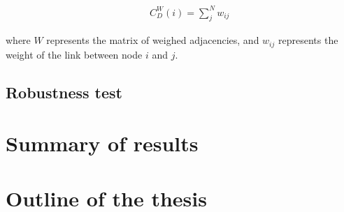 \begin{eqnarray}
&&C_D^W(i)=\sum_{j}^{N}w_{ij}
\end{eqnarray}

where $W$ represents the matrix of weighed adjacencies, and $w_{ij}$ represents the weight of the link between node $i$ and $j$.


\subsection{Robustness test}

\section{Summary of results}

\section{Outline of the thesis}

